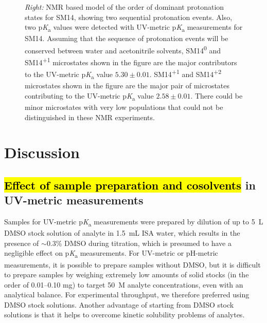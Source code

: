 \documentclass[9pt,lineno]{elife}
\newcommand{\pKa}{p\textit{K}\textsubscript{a}}
\begin{document}
\begin{figure}
\begin{center}
{\textit{Right:} NMR based model of the order of dominant protonation states for SM14, showing two sequential protonation events. 
Also, two \pKa{} values were detected with UV-metric \pKa{} measurements for SM14. 
Assuming that the sequence of protonation events will be conserved between water and acetonitrile solvents, SM14\textsuperscript{0} and SM14\textsuperscript{+1} microstates shown in the figure are the major contributors to the UV-metric \pKa{} value $5.30 \pm 0.01$. 
SM14\textsuperscript{+1} and SM14\textsuperscript{+2} microstates shown in the figure are the major pair of microstates contributing to the UV-metric \pKa{} value $2.58 \pm 0.01$. 
There could be minor microstates with very low populations that could not be distinguished in these NMR experiments.
}
\label{fig:NMR_microstates}
\end{center}
\end{figure}


\section{Discussion}

\subsection{\hl{Effect of sample preparation and cosolvents} in UV-metric measurements}

Samples for UV-metric \pKa{} measurements were prepared by dilution of up to 5~{\micro}L DMSO stock solution of analyte in 1.5~mL ISA water, which results in the presence of $\sim$0.3\% DMSO during titration, which is presumed to have a negligible effect on \pKa{} measurements. 
For UV-metric or pH-metric measurements, it is possible to prepare samples without DMSO, but it is difficult to prepare samples by weighing extremely low amounts of solid stocks (in the order of 0.01--0.10 mg) to target 50~{\micro}M analyte concentrations, even with an analytical balance. 
For experimental throughput, we therefore preferred using DMSO stock solutions. 
Another advantage of starting from DMSO stock solutions is that it helps to overcome kinetic solubility problems of analytes.
\end{document}
